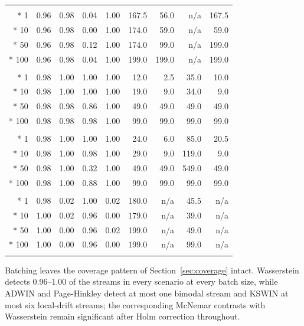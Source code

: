 \documentclass[preprint,12pt]{elsarticle}
\begin{document}
\begin{longtable}{rrrrrrrrr}
\addlinespace
\multicolumn{9}{l}{\textit{Local abrupt (LEA)}}\\*
1 & 0.96 & 0.98 & 0.04 & 1.00 & 167.5 & 56.0 & n/a & 167.5\\*
10 & 0.96 & 0.98 & 0.00 & 1.00 & 174.0 & 59.0 & n/a & 59.0\\*
50 & 0.96 & 0.98 & 0.12 & 1.00 & 174.0 & 99.0 & n/a & 199.0\\*
100 & 0.96 & 0.98 & 0.04 & 1.00 & 199.0 & 199.0 & n/a & 199.0\\
\addlinespace
\multicolumn{9}{l}{\textit{Global abrupt (GSG)}}\\*
1 & 0.98 & 1.00 & 1.00 & 1.00 & 12.0 & 2.5 & 35.0 & 10.0\\*
10 & 0.98 & 1.00 & 1.00 & 1.00 & 19.0 & 9.0 & 34.0 & 9.0\\*
50 & 0.98 & 0.98 & 0.86 & 1.00 & 49.0 & 49.0 & 49.0 & 49.0\\*
100 & 0.98 & 0.98 & 0.98 & 1.00 & 99.0 & 99.0 & 99.0 & 99.0\\
\addlinespace
\multicolumn{9}{l}{\textit{Transition 500}}\\*
1 & 0.98 & 1.00 & 1.00 & 1.00 & 24.0 & 6.0 & 85.0 & 20.5\\*
10 & 0.98 & 1.00 & 0.98 & 1.00 & 29.0 & 9.0 & 119.0 & 9.0\\*
50 & 0.98 & 1.00 & 0.32 & 1.00 & 49.0 & 49.0 & 549.0 & 49.0\\*
100 & 0.98 & 1.00 & 0.88 & 1.00 & 99.0 & 99.0 & 99.0 & 99.0\\
\addlinespace
\multicolumn{9}{l}{\textit{Bimodal shift}}\\*
1 & 0.98 & 0.02 & 1.00 & 0.02 & 180.0 & n/a & 45.5 & n/a\\*
10 & 1.00 & 0.02 & 0.96 & 0.00 & 179.0 & n/a & 39.0 & n/a\\*
50 & 1.00 & 0.00 & 0.96 & 0.02 & 199.0 & n/a & 49.0 & n/a\\*
100 & 1.00 & 0.00 & 0.96 & 0.00 & 199.0 & n/a & 99.0 & n/a\\
\addlinespace
\end{longtable}\endgroup

Batching leaves the coverage pattern of Section~\ref{sec:coverage} intact. Wasserstein detects 0.96--1.00 of the streams in every scenario at every batch size, while ADWIN and Page-Hinkley detect at most one bimodal stream and KSWIN at most six local-drift streams; the corresponding McNemar contrasts with Wasserstein remain significant after Holm correction throughout.
\end{document}
